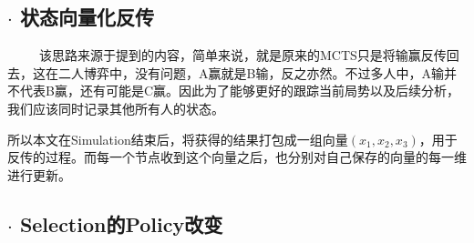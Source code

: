 \documentclass[9pt,twocolumn,twoside]{osajnl}
\begin{document}
\subsection{$\cdot$ 状态向量化反传\cite{MCTSMPG}}
\begin{adjustwidth}{2em}{}
	\ \ \ \ \
该思路来源于\cite{MCTSMPG}提到的内容，简单来说，就是原来的MCTS只是将输赢反传回去，这在二人博弈中，没有问题，A赢就是B输，反之亦然。不过多人中，A输并不代表B赢，还有可能是C赢。因此为了能够更好的跟踪当前局势以及后续分析，我们应该同时记录其他所有人的状态。

所以本文在Simulation结束后，将获得的结果打包成一组向量$(x_1,x_2,x_3)$，用于反传的过程。而每一个节点收到这个向量之后，也分别对自己保存的向量的每一维进行更新。
\end{adjustwidth}
\subsection{$\cdot$ Selection的Policy改变}
\end{document}
